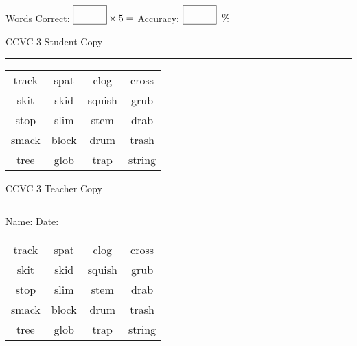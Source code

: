 \documentclass{memoir}
\begin{document}
\normalsize

Words Correct: $\fbox{\phantom{\huge 100}} \times 5 = $ Accuracy: $\fbox{\phantom{\huge 100}}\;\; \%$ 

\vfill

\newpage


\footnotesize \noindent
CCVC 3 \hfill Student Copy
\smallskip
\hrule

\Large

\setlength{\tabcolsep}{14pt}
\def\arraystretch{3}

{\selectfont


\begin{vplace}[0.5]
\begin{center}
\begin{tabular}{cccc}
track       & spat            & clog & cross \\
skit & skid & squish & grub \\
stop & slim & stem & drab             \\
smack & block & drum & trash \\
tree & glob & trap & string \\
\end{tabular}
\end{center}
\end{vplace}

}

\newpage

\footnotesize \noindent
CCVC 3 \hfill Teacher Copy
\smallskip
\hrule

\normalsize

\vfill

\noindent
Name: \underline{\hspace{1.75in}} \hfill Date: \underline{\hspace{1in}}

\Large

{\selectfont


\begin{vplace}[0.5]
\begin{center}
\begin{tabular}{cccc}
track       & spat            & clog & cross \\
skit & skid & squish & grub \\
stop & slim & stem & drab             \\
smack & block & drum & trash \\
tree & glob & trap & string \\
\end{tabular}
\end{center}
\end{vplace}



}
\end{document}

